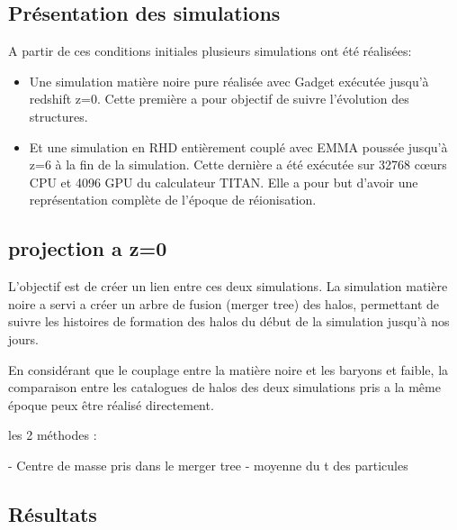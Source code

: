 

\subsection{Présentation des simulations}

A partir de ces conditions initiales plusieurs simulations ont été réalisées:

\begin{itemize}
\item Une simulation matière noire pure réalisée avec Gadget %
exécutée jusqu'à redshift z=0.
Cette première a pour objectif de suivre l'évolution des structures.

\item Et une simulation en RHD entièrement couplé avec EMMA poussée jusqu'à z=6 à la fin de la simulation.
Cette dernière a été exécutée sur 32768 cœurs CPU et 4096 GPU du calculateur TITAN.
Elle a pour but d'avoir une représentation complète de l'époque de réionisation.
\end{itemize}



\subsection{projection a z=0}

L'objectif est de créer un lien entre ces deux simulations.
La simulation matière noire a servi a créer un arbre de fusion (merger tree) des halos, permettant de suivre les histoires de formation des halos du début de la simulation jusqu'à nos jours.

En considérant que le couplage entre la matière noire et les baryons et faible, la comparaison entre les catalogues de halos des deux simulations pris a la même époque peux être réalisé directement.


les 2 méthodes :

- Centre de masse pris dans le merger tree
- moyenne du t des particules



\subsection{Résultats}


